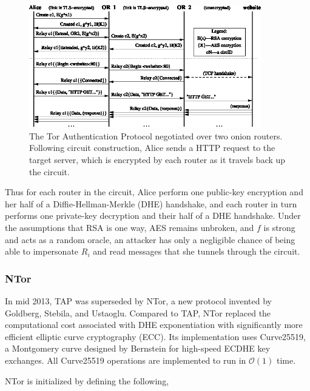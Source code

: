 \begin{figure}[htbp]
	\centering
	\includegraphics[width=0.9\textwidth]{images/Tor/tap.eps}
	\caption{The Tor Authentication Protocol negotiated over two onion routers. Following circuit construction, Alice sends a HTTP request to the target server, which is encrypted by each router as it travels back up the circuit.\cite{dingledine2004tor}\cite{ling2013protocol}}
\end{figure}

Thus for each router in the circuit, Alice perform one public-key encryption and her half of a Diffie-Hellman-Merkle (DHE) handshake, and each router in turn performs one private-key decryption and their half of a DHE handshake. Under the assumptions that RSA is one way, AES remains unbroken, and $ f $ is strong and acts as a random oracle, an attacker has only a negligible chance of being able to impersonate $ R_{i} $ and read messages that she tunnels through the circuit.\cite{goldberg2006security}

\subsubsection{NTor}

In mid 2013, TAP was superseded by NTor, a new protocol invented by Goldberg, Stebila, and Ustaoglu.\cite{goldberg2013anonymity} Compared to TAP, NTor replaced the computational cost associated with DHE exponentiation with significantly more efficient elliptic curve cryptography (ECC). Its implementation uses Curve25519,\cite{bernstein2006curve25519} a Montgomery curve designed by Bernstein for high-speed ECDHE key exchanges. All Curve25519 operations are implemented to run in $ \mathcal{O}(1) $ time.

NTor is initialized by defining the following,

